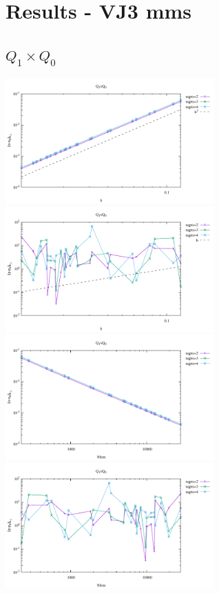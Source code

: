 \section*{Results - VJ3 mms}

\subsection*{$Q_1\times Q_0$}

\begin{center}
\includegraphics[width=8cm]{python_codes/fieldstone_120/results/Q1Q0-velocity-h.pdf}
\includegraphics[width=8cm]{python_codes/fieldstone_120/results/Q1Q0-pressure-h.pdf}\\
\includegraphics[width=8cm]{python_codes/fieldstone_120/results/Q1Q0-velocity-Nfem.pdf}
\includegraphics[width=8cm]{python_codes/fieldstone_120/results/Q1Q0-pressure-Nfem.pdf}
\end{center}


